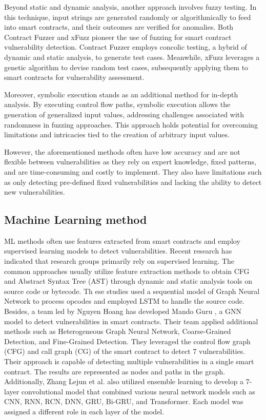 Beyond static and dynamic analysis, another approach involves fuzzy testing. In this technique, input strings are generated randomly or algorithmically to feed into smart contracts, and their outcomes are verified for anomalies. Both Contract Fuzzer \cite{contractFuzzer} and xFuzz \cite{xFuzz} pioneer the use of fuzzing for smart contract vulnerability detection. Contract Fuzzer employs concolic testing, a hybrid of dynamic and static analysis, to generate test cases. Meanwhile, xFuzz leverages a genetic algorithm to devise random test cases, subsequently applying them to smart contracts for vulnerability assessment.

Moreover, symbolic execution stands as an additional method for in-depth analysis. By executing control flow paths, symbolic execution allows the generation of generalized input values, addressing challenges associated with randomness in fuzzing approaches. This approach holds potential for overcoming limitations and intricacies tied to the creation of arbitrary input values.

However, the aforementioned methods often have low accuracy and are not flexible between vulnerabilities as they rely on expert knowledge, fixed patterns, and are time-consuming and costly to implement. They also have limitations such as only detecting pre-defined fixed vulnerabilities and lacking the ability to detect new vulnerabilities.

\subsection{Machine Learning method}

ML methods often use features extracted from smart contracts and employ supervised learning models to detect vulnerabilities. Recent research has indicated that research groups primarily rely on supervised learning. The common approaches usually utilize feature extraction methods to obtain CFG and Abstract Syntax Tree (AST) through dynamic and static analysis tools on source code or bytecode. Th
ese studies \cite{GCN, SC_GNN} used a sequential model of Graph Neural Network to process opcodes and employed LSTM to handle the source code. Besides, a team led by Nguyen Hoang has developed Mando Guru \cite{MandoGuru}, a GNN model to detect vulnerabilities in smart contracts. Their team applied additional methods such as Heterogeneous Graph Neural Network, Coarse-Grained Detection, and Fine-Grained Detection. They leveraged the control flow graph (CFG) and call graph (CG) of the smart contract to detect 7 vulnerabilities. Their approach is capable of detecting multiple vulnerabilities in a single smart contract. The results are represented as nodes and paths in the graph. Additionally, Zhang Lejun et al. \cite{anovelSC} also utilized ensemble learning to develop a 7-layer convolutional model that combined various neural network models such as CNN, RNN, RCN, DNN, GRU, Bi-GRU, and Transformer. Each model was assigned a different role in each layer of the model.

